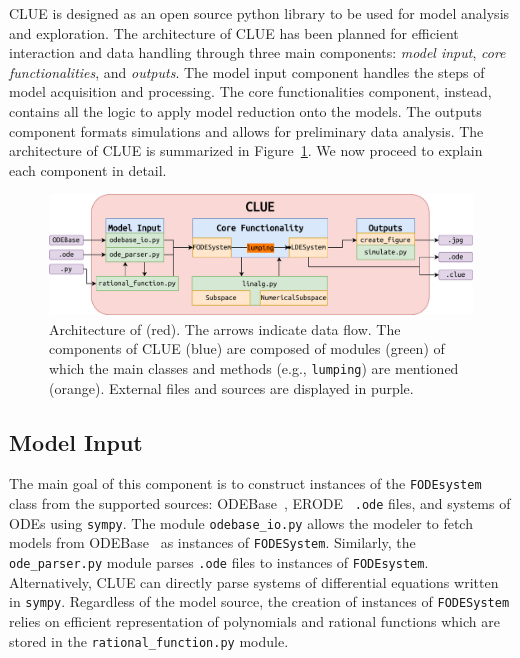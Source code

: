 CLUE is designed as an open source python library to be used for model analysis and exploration.
The architecture of CLUE has been planned for efficient interaction and data handling through three main components:
\emph{ model input}, \emph{core functionalities}, and \emph{outputs}. 
The model input component handles the steps of model acquisition and processing.
The core functionalities component, instead, contains all the logic to apply model reduction onto the models.
The outputs component formats simulations and allows for preliminary data analysis. 
The architecture of CLUE is summarized in Figure~\ref{fig:clue_arch}.
We now proceed to explain each component in detail.
\begin{figure}
	\centering
	\includegraphics[width=\textwidth]{img/clue.pdf}
	\caption{Architecture of \ToolName(red).
        The arrows indicate data flow.
        The components of CLUE (blue) are composed of modules (green) of which the main classes and methods (e.g., \texttt{lumping}) are mentioned (orange).
        External files and sources are displayed in purple.
     }
	\label{fig:clue_arch}
\end{figure}

\subsection{Model Input}
The main goal of this component is to construct instances of the \texttt{FODEsystem} class from the supported sources: ODEBase~\cite{LuedersSturmRadulescu22},  ERODE~\cite{cardelli_erode_2017} \texttt{.ode} files, and systems of ODEs using \texttt{sympy}.
The module \texttt{odebase\_io.py} allows the modeler to fetch models from ODEBase~\cite{LuedersSturmRadulescu22} as instances of \texttt{FODESystem}.
Similarly, the \texttt{ode\_parser.py} module parses \texttt{.ode} files to instances of \texttt{FODEsystem}. 
Alternatively, CLUE can directly parse systems of differential equations written in \texttt{sympy}. 
Regardless of the model source, the creation of instances of \texttt{FODESystem} relies on efficient representation of polynomials and rational functions which are stored in the \texttt{rational\_function.py} module.

